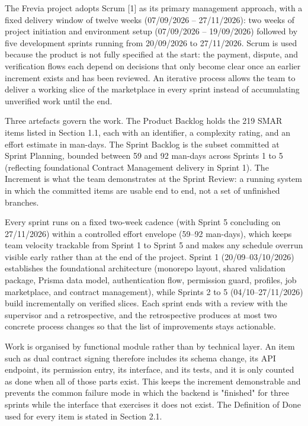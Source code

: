 The Frevia project adopts Scrum [1] as its primary management approach, with a fixed delivery window of twelve weeks (07/09/2026 -- 27/11/2026): two weeks of project initiation and environment setup (07/09/2026 -- 19/09/2026) followed by five development sprints running from 20/09/2026 to 27/11/2026. Scrum is used because the product is not fully specified at the start: the payment, dispute, and verification flows each depend on decisions that only become clear once an earlier increment exists and has been reviewed. An iterative process allows the team to deliver a working slice of the marketplace in every sprint instead of accumulating unverified work until the end.

Three artefacts govern the work. The Product Backlog holds the 219 SMAR items listed in Section 1.1, each with an identifier, a complexity rating, and an effort estimate in man-days. The Sprint Backlog is the subset committed at Sprint Planning, bounded between 59 and 92 man-days across Sprints 1 to 5 (reflecting foundational Contract Management delivery in Sprint 1). The Increment is what the team demonstrates at the Sprint Review: a running system in which the committed items are usable end to end, not a set of unfinished branches.

Every sprint runs on a fixed two-week cadence (with Sprint 5 concluding on 27/11/2026) within a controlled effort envelope (59--92 man-days), which keeps team velocity trackable from Sprint 1 to Sprint 5 and makes any schedule overrun visible early rather than at the end of the project. Sprint 1 (20/09--03/10/2026) establishes the foundational architecture (monorepo layout, shared validation package, Prisma data model, authentication flow, permission guard, profiles, job marketplace, and contract management), while Sprints 2 to 5 (04/10--27/11/2026) build incrementally on verified slices. Each sprint ends with a review with the supervisor and a retrospective, and the retrospective produces at most two concrete process changes so that the list of improvements stays actionable.

Work is organised by functional module rather than by technical layer. An item such as dual contract signing therefore includes its schema change, its API endpoint, its permission entry, its interface, and its tests, and it is only counted as done when all of those parts exist. This keeps the increment demonstrable and prevents the common failure mode in which the backend is "finished" for three sprints while the interface that exercises it does not exist. The Definition of Done used for every item is stated in Section 2.1.

